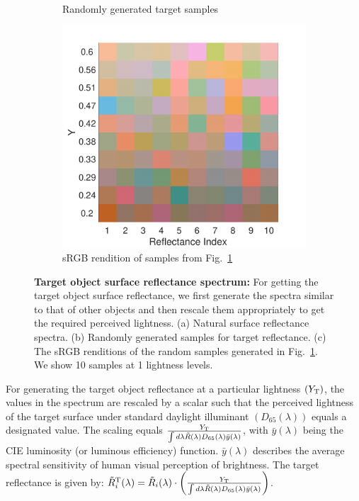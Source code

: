 \documentclass{jov}
\begin{document}
\begin{figure}
\begin{subfigure}[b]{0.3\textwidth}
        \caption{Randomly generated target samples}
        \label{fig:randomSurfaceTarget}
    \end{subfigure}
    \begin{subfigure}[b]{0.3 \textwidth}
    \centering
        \includegraphics[width=\textwidth]{../Figures/Figure14/Figure14_c.pdf}
        \caption{sRGB rendition of samples from Fig.~\ref{fig:randomSurfaceTarget}}
        \label{fig:sRGBSurfaceTarget}
    \end{subfigure}
    \caption{{\bf Target object surface reflectance spectrum:} For getting the target object surface reflectance, we first generate the spectra similar to that of other objects and then rescale them appropriately to get the required perceived lightness. (a) Natural surface reflectance spectra. (b) Randomly generated samples for target reflectance. (c) The sRGB renditions of the random samples generated in Fig.~\ref{fig:randomSurfaceTarget}. We show 10 samples at 1 lightness levels.}\label{fig:targetSurfaceReflectance}
\end{figure}


For generating the target object reflectance at a particular lightness $(Y_{\rm T})$, the values in the spectrum are 
rescaled by a scalar such that the perceived lightness of the 
target surface under standard daylight illuminant $(D_{65}(\lambda))$ 
equals a designated value. The scaling equals $\frac{Y_{\rm T}}{\int d\lambda \tilde{R}(\lambda) D_{65}(\lambda) \bar{y}(\lambda)}$, with $\bar{y}(\lambda)$ being the CIE luminosity (or luminous efficiency) function. 
$\bar{y}(\lambda)$ describes the average spectral sensitivity of human visual 
perception of brightness. The target reflectance is given by: $\tilde{R}^{\rm T}_i(\lambda) =\tilde{R}_i(\lambda) \cdot\left(\frac{Y_{\rm T}}{\int d\lambda \tilde{R}(\lambda) D_{65}(\lambda) \bar{y}(\lambda)}\right)$.
\end{document}
